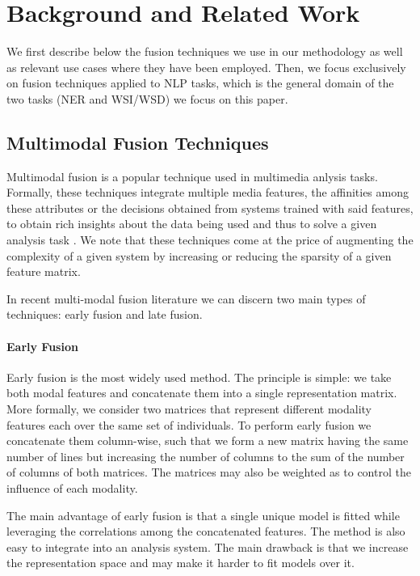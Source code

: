 \documentclass[11pt]{article}
\begin{document}
\section{Background and Related Work}
 
We first describe below the fusion techniques we use in our methodology as well as relevant use cases where they have been employed. Then, we focus exclusively on fusion techniques applied to NLP tasks, which is the general domain of the two tasks (NER and WSI/WSD) we focus on this paper.                                                                                                                 
\subsection{Multimodal Fusion Techniques}
Multimodal fusion is a popular technique used in multimedia anlysis tasks. Formally, these techniques integrate multiple media features, the affinities among these attributes or the decisions obtained from systems trained with said features, to obtain rich insights about the data being used and thus to solve a given analysis  task \cite{AtreyHEK10}. We note that these techniques come at the price of augmenting the complexity of a given system by increasing or reducing the sparsity of a given feature matrix.


In recent multi-modal fusion literature we can discern two main types of techniques: early fusion and late fusion. 
\paragraph{Early Fusion}
Early fusion is the most widely used method. The principle is simple: we take both modal features and concatenate them into a single representation matrix. More formally, we consider two matrices  that represent different modality features each  over the same set of individuals. To perform early fusion we concatenate them column-wise, such that we form a new matrix having the same number of lines but increasing the number of columns to the sum of the number of columns of both matrices. The matrices may also be weighted as to control the influence of each modality.

The main advantage of early fusion is that a single unique model is fitted while leveraging the correlations among the concatenated features. The method is also easy to integrate into an analysis system. The main drawback is that we increase the representation space and may make it harder to fit models over it.
%
\end{document}

